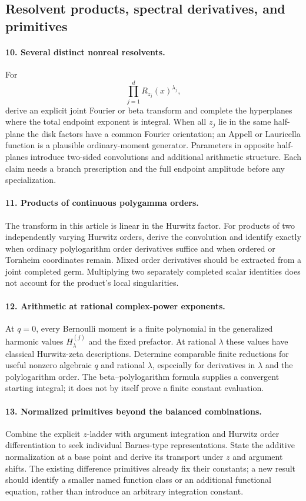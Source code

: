 \documentclass[11pt,a4paper]{article}
\numberwithin{equation}{section}
\theoremstyle{definition}
\theoremstyle{remark}
\begin{document}
\subsection{Resolvent products, spectral derivatives, and primitives}

\paragraph{10. Several distinct nonreal resolvents.}
For
\[
\prod_{j=1}^d R_{z_j}(x)^{\lambda_j},
\]
derive an explicit joint Fourier or beta transform and complete
the hyperplanes where the total endpoint exponent is integral.
When all $z_j$ lie in the same half-plane the disk factors have
a common Fourier orientation; an Appell or Lauricella function
is a plausible ordinary-moment generator. Parameters in opposite
half-planes introduce two-sided convolutions and additional
arithmetic structure. Each claim needs a branch prescription and
the full endpoint amplitude before any specialization.

\paragraph{11. Products of continuous polygamma orders.}
The transform in this article is linear in the Hurwitz factor.
For products of two independently varying Hurwitz orders, derive
the convolution and identify exactly when ordinary polylogarithm
order derivatives suffice and when ordered or Tornheim coordinates
remain. Mixed order derivatives should be extracted from a joint
completed germ. Multiplying two separately completed scalar
identities does not account for the product's local singularities.

\paragraph{12. Arithmetic at rational complex-power exponents.}
At $q=0$, every Bernoulli moment is a finite polynomial in the
generalized harmonic values $H_\lambda^{(j)}$ and the fixed
prefactor. At rational $\lambda$ these values have classical
Hurwitz-zeta descriptions. Determine comparable finite reductions
for useful nonzero algebraic $q$ and rational $\lambda$, especially
for derivatives in $\lambda$ and the polylogarithm order.
The beta--polylogarithm formula supplies a convergent starting
integral; it does not by itself prove a finite constant evaluation.

\paragraph{13. Normalized primitives beyond the balanced combinations.}
Combine the explicit $z$-ladder with argument integration and
Hurwitz order differentiation to seek individual Barnes-type
representations. State the additive normalization at a base point
and derive its transport under $z$ and argument shifts. The
existing difference primitives already fix their constants; a
new result should identify a smaller named function class or an
additional functional equation, rather than introduce an arbitrary
integration constant.
\end{document}
